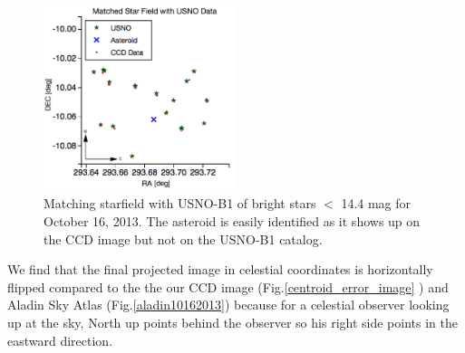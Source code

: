 \documentclass[authoryear, 12pt,5p, times]{elsarticle}
\begin{document}
	\begin{figure}[h!]
\includegraphics[width=0.5\textwidth]{figures/starfield_match}
\caption{ Matching starfield with USNO-B1 of bright stars $<$ 14.4 mag for October 16, 2013. The asteroid is easily identified as it shows up on the CCD image but not on the USNO-B1 catalog.}
\label{starfield_match}
\end{figure}
We find that the final projected image in celestial coordinates is horizontally flipped compared to the the our CCD image (Fig.\ref{centroid_error_image} ) and  Aladin Sky Atlas (Fig.\ref{aladin10162013}) because for a celestial observer looking up at the sky, North up points behind the observer so his right side points in the eastward direction.


\end{document}
